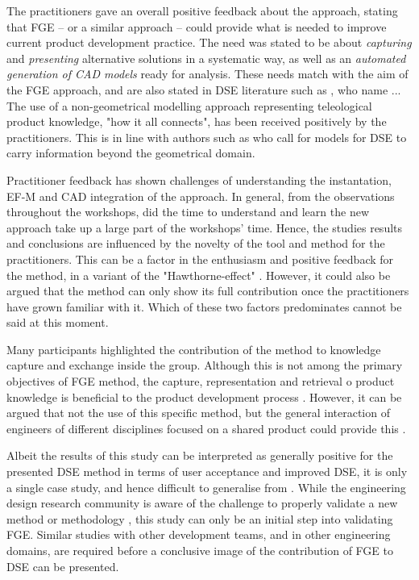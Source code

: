 \documentclass[preprints,article,accept,moreauthors,pdftex]{Definitions/mdpi}
\newcommand{\Jakob}[1]{{{\color{orange}{\itshape{#1}}\color{black}}
    }{\ignorespaces}}
\begin{document}
The practitioners gave an overall positive feedback about the approach, stating that \ac{FGE} -- or a similar approach -- could provide what is needed to improve current product development practice.
The need was stated to be about \textit{capturing} and \textit{presenting} alternative solutions in a systematic way, as well as an \textit{automated generation of CAD models} ready for analysis.
These needs match with the aim of the \ac{FGE} approach, and are also stated in \ac{DSE} literature such as \cite{Kang2011}, who name ...
The use of a non-geometrical modelling approach representing teleological product knowledge, "how it all connects", has been received positively by the practitioners.
This is in line with authors such as \cite{Woodbury2006, Cohrs2014} who call for models for \ac{DSE} to carry information beyond the geometrical domain.


Practitioner feedback has shown challenges of understanding the instantation, \ac{EF-M} and CAD integration of the approach.
In general, from the observations throughout the workshops, did the time to understand and learn the new approach take up a large part of the workshops' time.
Hence, the studies results and conclusions are influenced by the novelty of the tool and method for the practitioners.
This can be a factor in the enthusiasm and positive feedback for the method, in a variant of the "Hawthorne-effect" \cite{MaccarneyHawthorne}.
However, it could also be argued that the method can only show its full contribution once the practitioners have grown familiar with it.
Which of these two factors predominates cannot be said at this moment.

Many participants highlighted the contribution of the method to knowledge capture and exchange inside the group.
Although this is not among the primary objectives of \ac{FGE} method, the capture, representation and retrieval o product knowledge is beneficial to the product development process \cite{Stokes2001}.
However, it can be argued that not the use of this specific method, but the general interaction of engineers of different disciplines focused on a shared product could provide this \cite{Tayal2012}.



Albeit the results of this study can be interpreted as generally positive for the presented \ac{DSE} method in terms of user acceptance and improved \ac{DSE}, it is only a single case study, and hence difficult to generalise from \citep{Blessing2002}.
While the engineering design research community is aware of the challenge to properly validate a new method or methodology \citep{Barth2011, Almefelt2006}, this study can only be an initial step into validating \ac{FGE}.
Similar studies with other development teams, and in other engineering domains, are required before a conclusive image of the contribution of \ac{FGE} to \ac{DSE} can be presented.
\end{document}
